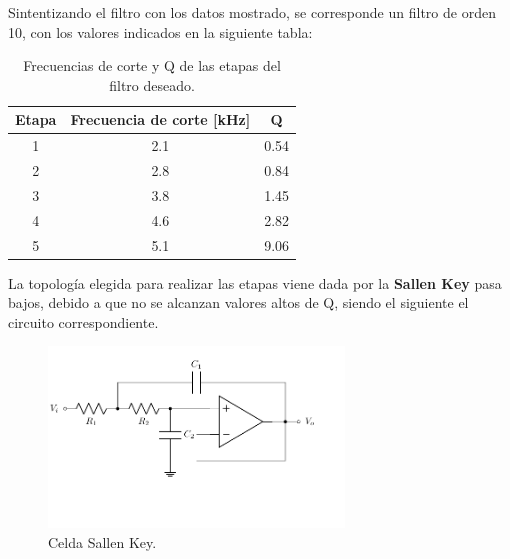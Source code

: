 Sintentizando el filtro con los datos mostrado, se corresponde un filtro de orden 10, con los valores indicados en la siguiente tabla:
\begin{table}[H]
\centering
\begin{tabular}{ccc}
\hline
\textbf{Etapa} & \textbf{Frecuencia de corte [kHz]} & \textbf{Q} \\ \hline
1 & 2.1 & 0.54 \\
2 & 2.8 & 0.84 \\
3 & 3.8 & 1.45 \\
4 & 4.6 & 2.82 \\
5 & 5.1 & 9.06 \\ \hline
\end{tabular}
\caption{Frecuencias de corte y Q de las etapas del filtro deseado.}
\end{table}

La topología elegida para realizar las etapas viene dada por la \textbf{Sallen Key} pasa bajos, debido a que no se alcanzan valores altos de Q, siendo el siguiente el circuito correspondiente.
\begin{figure}[H]
\centering
	\includegraphics[width=0.7\textwidth]{ImagenesEjercicio2/SK.pdf}
	\caption{Celda Sallen Key.}
	\label{fig:SK}
\end{figure}

